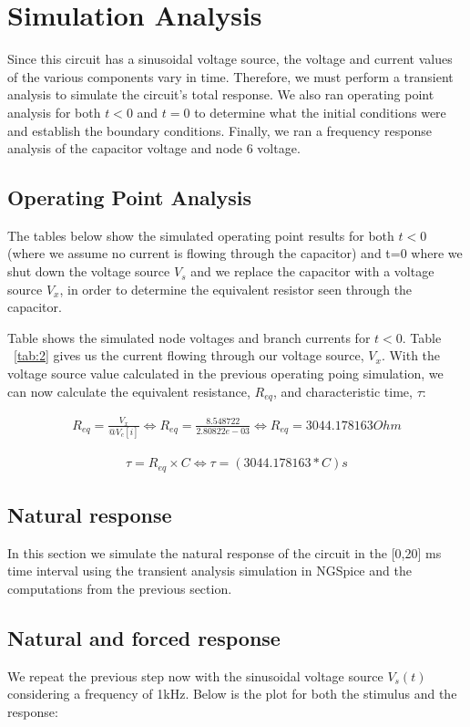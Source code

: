 \newpage
\section{Simulation Analysis}
\label{sec:simulation}
Since this circuit has a sinusoidal voltage source, the voltage and current values of the various components vary in time. Therefore, we must perform a transient analysis to simulate the circuit's total response. We also ran operating point analysis for both $t<0$ and $t=0$ to determine what the initial conditions were and establish the boundary conditions. Finally, we ran a frequency response analysis of the capacitor voltage and node 6 voltage.
\subsection{Operating Point Analysis}
The tables below show the simulated operating point results for both $t<0$ (where we assume no current is flowing through the capacitor) and t=0 where we shut down the voltage source $V_{s}$ and we replace the capacitor with a voltage source $V_{x}$, in order to determine the equivalent resistor seen through the capacitor.


Table shows the simulated node voltages and branch currents for $t<0$. Table ~\ref{tab:2} gives us the current flowing through our voltage source, $V_{x}$. With the voltage source value calculated in the previous operating poing simulation, we can now calculate the equivalent resistance, $R_{eq}$, and characteristic time, $\tau$:

\begin{gather*}
  R_{eq} = \frac{V_x}{@V_c[i]} \Leftrightarrow R_{eq} = \frac{8.548722}{2.80822e-03} \Leftrightarrow R_{eq} = 3044.178163 Ohm
\end{gather*}

\begin{gather*}
  \tau = R_{eq} \times C \Leftrightarrow \tau = (3044.178163*C)   s
\end{gather*}

\newpage
\subsection{Natural response}
In this section we simulate the natural response of the circuit in the [0,20] ms time interval using the transient analysis simulation in NGSpice and the computations from the previous section.
\subsection{Natural and forced response}
We repeat the previous step now with the sinusoidal voltage source $V_{s}(t)$ considering a frequency of 1kHz. Below is the plot for both the stimulus and the response:
\newpage
